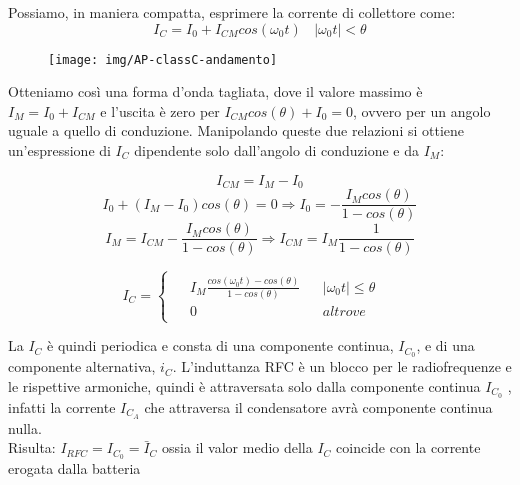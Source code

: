 Possiamo, in maniera compatta, esprimere la corrente di collettore come:
\[I_C = I_0 + I_{CM} cos(\omega_0t) ~~~~ |\omega_0t|<\theta \]

\begin{figure}[tbh]
\centering
\texttt{[image: img/AP-classC-andamento]}
\caption{}
\label{fig:ap-classc-andamento}
\end{figure}

Otteniamo così una forma d'onda tagliata, dove il valore massimo è $I_M = I_0 + I_{CM}$ e l'uscita è zero per $I_{CM}cos(\theta) + I_0 = 0$, ovvero per un angolo uguale a quello di conduzione.  Manipolando queste due relazioni si ottiene un'espressione di $I_C$ dipendente solo dall'angolo di conduzione e da $I_M$:

\[I_{CM} = I_M - I_0\]
\[I_0 + (I_M - I_0)cos(\theta) = 0 \Rightarrow I_0 = - \frac{I_Mcos(\theta)}{1-cos(\theta)}\] 
\[I_M = I_{CM} - \frac{I_Mcos(\theta)}{1-cos(\theta)} \Rightarrow 
I_{CM} = I_M \frac{1}{1-cos(\theta)}  \]

\[I_C = 
\begin{cases}
\begin{aligned}
&I_M \frac{cos(\omega_0t)-cos(\theta)}{1-cos(\theta)}& &|\omega_0t|\le \theta &\\
&0& &altrove&
\end{aligned}
\end{cases}
\]

%

La $I_C$ è quindi periodica e consta di una componente continua, $I_{C_0}$, e di una componente alternativa, $i_C$. L'induttanza RFC è un blocco per le radiofrequenze e le rispettive armoniche, quindi è attraversata
solo dalla componente continua $I_{C_0}$ , infatti la corrente $I_{C_A}$ che attraversa il condensatore avrà
componente continua nulla.\\
Risulta:
$I_{RFC} = I_{C_0} = \bar{I}_C$ ossia il valor medio della $I_C$ coincide con la corrente erogata dalla batteria

